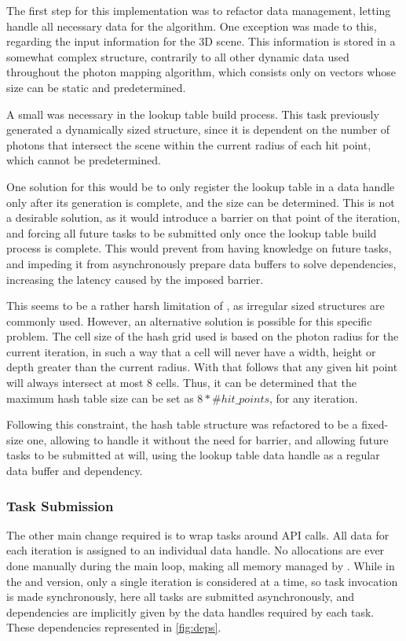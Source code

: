 \documentclass[main.tex]{subfiles}
\begin{document}
The first step for this implementation was to refactor data management, letting \starpu handle all necessary data for the algorithm. One exception was made to this, regarding the input information for the 3D scene. This information is stored in a somewhat complex structure, contrarily to all other dynamic data used throughout the photon mapping algorithm, which consists only on vectors whose size can be static and predetermined.

A small was necessary in the lookup table build process. This task previously generated a dynamically sized structure, since it is dependent on the number of photons that intersect the scene within the current radius of each hit point, which cannot be predetermined.

One solution for this would be to only register the lookup table in a \starpu data handle only after its generation is complete, and the size can be determined. This is not a desirable solution, as it would introduce a barrier on that point of the iteration, and forcing all future tasks to be submitted only once the lookup table build process is complete. This would prevent \starpu from having knowledge on future tasks, and impeding it from asynchronously prepare data buffers to solve dependencies, increasing the latency caused by the imposed barrier.

This seems to be a rather harsh limitation of \starpu, as irregular sized structures are commonly used. However, an alternative solution is possible for this specific problem. The cell size of the hash grid used is based on the photon radius for the current iteration, in such a way that a cell will never have a width, height or depth greater than the current radius. With that follows that any given hit point will always intersect at most 8 cells. Thus, it can be determined that the maximum hash table size can be set as $8 * \#hit\_points$, for any iteration.

Following this constraint, the hash table structure was refactored to be a fixed-size one, allowing \starpu to handle it without the need for barrier, and allowing future tasks to be submitted at will, using the lookup table data handle as a regular data buffer and dependency.

\subsubsection{Task Submission}

The other main change required is to wrap tasks around \starpu API calls. All data for each iteration is assigned to an individual data handle. No allocations are ever done manually during the main loop, making all memory managed by \starpu. While in the \cpu and \cuda version, only a single iteration is considered at a time, so task invocation is made synchronously, here all tasks are submitted asynchronously, and dependencies are implicitly given by the data handles required by each task. These dependencies represented in \cref{fig:deps}.
\end{document}
